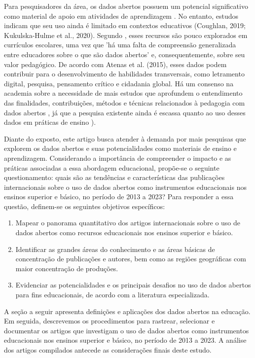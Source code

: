 \documentclass[portuguese]{textolivre}
\begin{document}
Para pesquisadores da área, os dados abertos possuem um potencial significativo como material de apoio em atividades de aprendizagem \cite{coughlan2019}. No entanto, estudos indicam que seu uso ainda é limitado em contextos educativos (Coughlan, 2019; Kukulska-Hulme et al., 2020). Segundo \textcite[p.~387]{coughlan2019}, esses recursos são pouco explorados em currículos escolares, uma vez que 'há uma falta de compreensão generalizada entre educadores sobre o que são dados abertos' e, consequentemente, sobre seu valor pedagógico. De acordo com Atenas et al. (2015), esses dados podem contribuir para o desenvolvimento de habilidades transversais, como letramento digital, pesquisa, pensamento crítico e cidadania global. Há um consenso na academia sobre a necessidade de mais estudos que aprofundem o entendimento das finalidades, contribuições, métodos e técnicas relacionados à pedagogia com dados abertos \cite{bhargava2015,wolff2015,buzato2018,lima-lopes2022,lima-lopes2023}, já que a pesquisa existente ainda é escassa quanto ao uso desses dados em práticas de ensino \cite{coughlan2019}).

Diante do exposto, este artigo busca atender à demanda por mais pesquisas que explorem os dados abertos e suas potencialidades como materiais de ensino e aprendizagem. Considerando a importância de compreender o impacto e as práticas associadas a essa abordagem educacional, propõe-se o seguinte questionamento: 
quais são as tendências e características das publicações internacionais sobre o uso de dados abertos como instrumentos educacionais nos ensinos superior e básico, no período de 2013 a 2023? Para responder a essa questão, definem-se os seguintes objetivos específicos:
\begin{enumerate}
    \item Mapear o panorama quantitativo dos artigos internacionais sobre o uso de dados abertos como recursos educacionais nos ensinos superior e básico.
    \item Identificar as grandes áreas do conhecimento e as áreas básicas de concentração de publicações e autores, bem como as regiões geográficas com maior concentração de produções.
    \item Evidenciar as potencialidades e os principais desafios no uso de dados abertos para fins educacionais, de acordo com a literatura especializada.
\end{enumerate}

A seção a seguir apresenta definições e aplicações dos dados abertos na educação. Em seguida, descrevemos os procedimentos para rastrear, selecionar e documentar os artigos que investigam o uso de dados abertos como instrumentos educacionais nos ensinos superior e básico, no período de 2013 a 2023. A análise dos artigos compilados antecede as considerações finais deste estudo.
\end{document}
